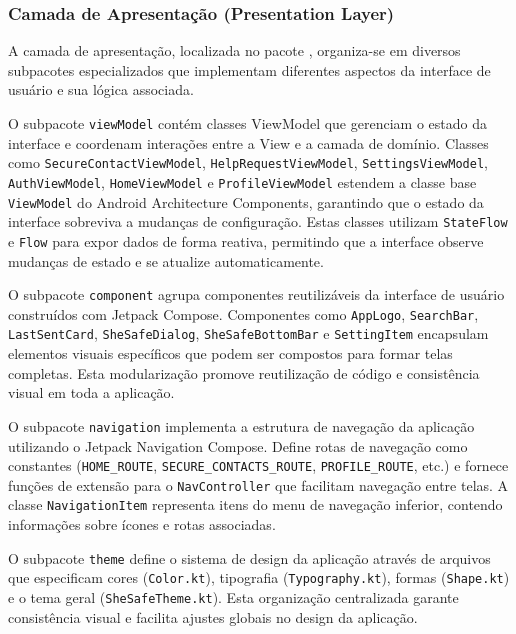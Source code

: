 \subsubsection{Camada de Apresentação (Presentation Layer)}
A camada de apresentação, localizada no pacote , organiza-se em diversos subpacotes especializados que implementam diferentes aspectos da interface de usuário e sua lógica associada.

O subpacote \texttt{viewModel} contém classes ViewModel que gerenciam o estado da interface e coordenam interações entre a View e a camada de domínio. Classes como \texttt{SecureContactViewModel}, \texttt{HelpRequestViewModel}, \texttt{SettingsViewModel}, \texttt{AuthViewModel}, \texttt{HomeViewModel} e \texttt{ProfileViewModel} estendem a classe base \texttt{ViewModel} do Android Architecture Components, garantindo que o estado da interface sobreviva a mudanças de configuração. Estas classes utilizam \texttt{StateFlow} e \texttt{Flow} para expor dados de forma reativa, permitindo que a interface observe mudanças de estado e se atualize automaticamente.

O subpacote \texttt{component} agrupa componentes reutilizáveis da interface de usuário construídos com Jetpack Compose. Componentes como \texttt{AppLogo}, \texttt{SearchBar}, \texttt{LastSentCard}, \texttt{SheSafeDialog}, \texttt{SheSafeBottomBar} e \texttt{SettingItem} encapsulam elementos visuais específicos que podem ser compostos para formar telas completas. Esta modularização promove reutilização de código e consistência visual em toda a aplicação.

O subpacote \texttt{navigation} implementa a estrutura de navegação da aplicação utilizando o Jetpack Navigation Compose. Define rotas de navegação como constantes (\texttt{HOME\_ROUTE}, \texttt{SECURE\_CONTACTS\_ROUTE}, \texttt{PROFILE\_ROUTE}, etc.) e fornece funções de extensão para o \texttt{NavController} que facilitam navegação entre telas. A classe \texttt{NavigationItem} representa itens do menu de navegação inferior, contendo informações sobre ícones e rotas associadas.

O subpacote \texttt{theme} define o sistema de design da aplicação através de arquivos que especificam cores (\texttt{Color.kt}), tipografia (\texttt{Typography.kt}), formas (\texttt{Shape.kt}) e o tema geral (\texttt{SheSafeTheme.kt}). Esta organização centralizada garante consistência visual e facilita ajustes globais no design da aplicação.

